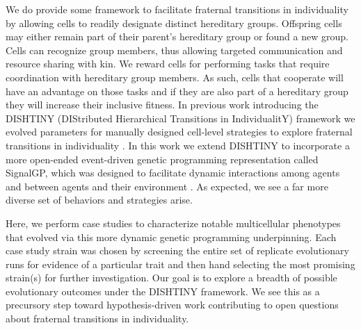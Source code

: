 We do provide some framework to facilitate fraternal transitions in individuality by allowing cells to readily designate distinct hereditary groups.
Offspring cells may either remain part of their parent's hereditary group or found a new group.
Cells can recognize group members, thus allowing targeted communication and resource sharing with kin.
We reward cells for performing tasks that require coordination with hereditary group members.
As such, cells that cooperate will have an advantage on those tasks and if they are also part of a hereditary group they will increase their inclusive fitness.
In previous work introducing the DISHTINY (DIStributed Hierarchical Transitions in IndividualitY) framework we evolved parameters for manually designed cell-level strategies to explore fraternal transitions in individuality \citep{moreno2019toward}.
In this work we extend DISHTINY to incorporate a more open-ended event-driven genetic programming representation called SignalGP, which was designed to facilitate dynamic interactions among agents and between agents and their environment \citep{lalejini2018evolving}.
As expected, we see a far more diverse set of behaviors and strategies arise.

Here, we perform case studies to characterize notable multicellular phenotypes that evolved via this more dynamic genetic programming underpinning.
Each case study strain was chosen by screening the entire set of replicate evolutionary runs for evidence of a particular trait and then hand selecting the most promising strain(s) for further investigation.
Our goal is to explore a breadth of possible evolutionary outcomes under the DISHTINY framework.
We see this as a precursory step toward hypothesis-driven work contributing to open questions about fraternal transitions in individuality.
